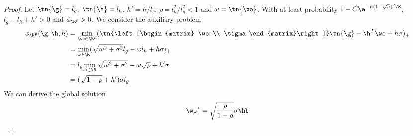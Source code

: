 \begin{proof}
Let $\tn{\g}=l_g$, $\tn{\h}=l_h$, $h'=h/l_g$, $\rho=l_h^2/l_g^2<1$ and $\omega=\tn{\wo}$. With at least probability $1-C\e^{-n(1-\sqrt{\kappa})^2/8}$, $l_g-l_h+h'>0$ and $\phi_{\R^p}>0$. We consider the auxiliary problem
\begin{align}
    \phi_{\R^p}(\g,\h,h)&=\min_{\wo\in\R^p}(\tn{\left[\begin{matrix}
        \wo  \\
        \sigma 
    \end{matrix}\right]}\tn{\g}-\h^T\wo+h\sigma)_+\\
    &=\min_{\omega\in\R}(\sqrt{\omega^2+\sigma^2}l_g-\omega l_h+h\sigma)_+\\
    &=l_g\min_{\omega\in\R}\sqrt{\omega^2+\sigma^2}-\omega \sqrt{\rho}+h'\sigma\\
    &=(\sqrt{1-\rho}+h')\sigma l_g
\end{align}
We can derive the global solution
\begin{align}
\wo^*=\sqrt{\frac{\rho}{1-\rho}}\sigma\hb\label{wo over R}
\end{align}


\end{proof}

